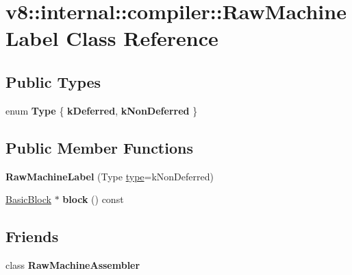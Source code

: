 \hypertarget{classv8_1_1internal_1_1compiler_1_1RawMachineLabel}{}\section{v8\+:\+:internal\+:\+:compiler\+:\+:Raw\+Machine\+Label Class Reference}
\label{classv8_1_1internal_1_1compiler_1_1RawMachineLabel}
\subsection*{Public Types}
\begin{DoxyCompactItemize}
\item 
\mbox{\label{classv8_1_1internal_1_1compiler_1_1RawMachineLabel_aa5b9e2d6c7b396e8a33dad1a076b3fae}} 
enum {\bfseries Type} \{ {\bfseries k\+Deferred}, 
{\bfseries k\+Non\+Deferred}
 \}
\end{DoxyCompactItemize}
\subsection*{Public Member Functions}
\begin{DoxyCompactItemize}
\item 
\mbox{\label{classv8_1_1internal_1_1compiler_1_1RawMachineLabel_ae8cc384c9e887ebc3e0c6b8bca058dbd}} 
{\bfseries Raw\+Machine\+Label} (Type \mbox{\hyperlink{classstd_1_1conditional_1_1type}{type}}=k\+Non\+Deferred)
\item 
\mbox{\label{classv8_1_1internal_1_1compiler_1_1RawMachineLabel_a5688f3df416d0d87d732b1427d87ab3e}} 
\mbox{\hyperlink{classv8_1_1internal_1_1compiler_1_1BasicBlock}{Basic\+Block}} $\ast$ {\bfseries block} () const
\end{DoxyCompactItemize}
\subsection*{Friends}
\begin{DoxyCompactItemize}
\item 
\mbox{\label{classv8_1_1internal_1_1compiler_1_1RawMachineLabel_a14407edaf8af33febf237ed95c292a7a}} 
class {\bfseries Raw\+Machine\+Assembler}
\end{DoxyCompactItemize}


